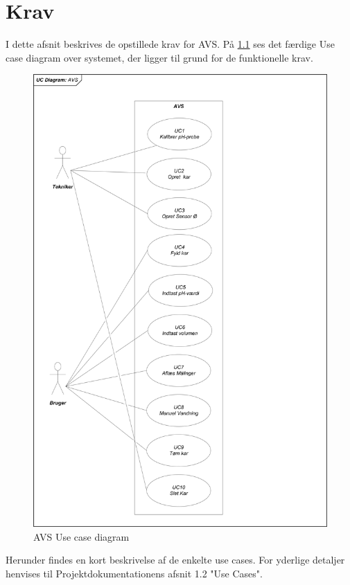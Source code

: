 \chapter{Krav}

I dette afsnit beskrives de opstillede krav for AVS. På \ref{photo:UseCD} ses det færdige Use case diagram over systemet, der ligger til grund for de funktionelle krav.

\begin{figure}[H]
	\centering
	\includegraphics[scale=0.6]{Krav/Billeder/AVS_UseCases}
	\caption{AVS Use case diagram}
	\label{photo:UseCD}
\end{figure}

Herunder findes en kort beskrivelse af de enkelte use cases.\newline 
For yderlige detaljer henvises til Projektdokumentationens afsnit 1.2 "Use Cases".

